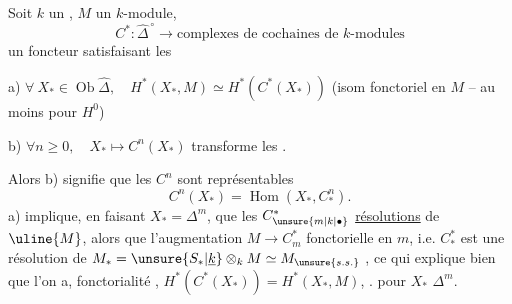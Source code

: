 
Soit $k$ un , $M$ un $k$-module,
\[
 C^*\colon\widehat{\Delta}^{\,\circ}\longrightarrow
 \text{complexes de cochaines de $k$-modules}
\]
un foncteur satisfaisant les 

a) $\forall\ X_*\in\operatorname{Ob}\widehat{\Delta},\quad H^*(X_*,M)\simeq H^*(C^*(X_*))$ (isom fonctoriel en $M$ -- au moins pour $H^0$)

b) $\forall n\geq 0,\quad X_*\longmapsto C^n(X_*)$ transforme les .

Alors b) signifie que les $C^n$ sont représentables
\[
 C^n(X_*)=\operatorname{Hom}(X_*,C_*^n).
\]
a) implique, en faisant $X_*=\Delta^m$, que les $C_{\unsure{m|k|\bullet}}^*$  \uline{résolutions} de $\uline{M}$, alors que l'augmentation $M\to C_m^*$  fonctorielle en $m$, i.e. $C_*^*$ est une résolution de $M_*=\unsure{S_*|\underline{k}}\otimes_k M\simeq M_{\unsure{s.s.}}$ , ce qui explique bien que l'on a,  fonctorialité , $H^*(C^*(X_*))=H^*(X_*,M)$,
.  pour $X_*$  $\Delta^m$.

